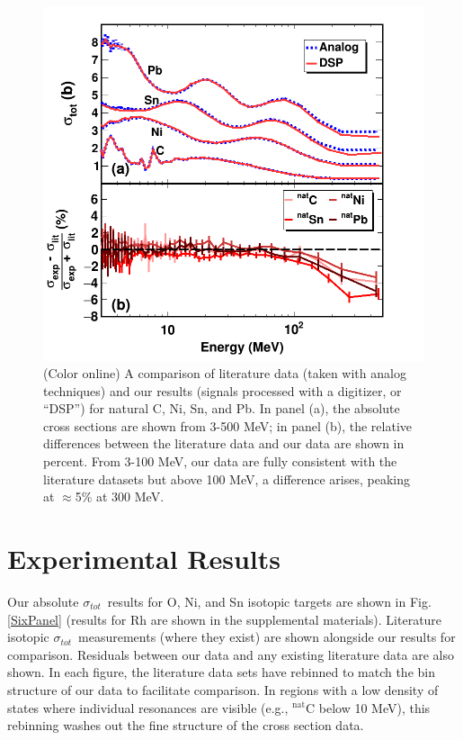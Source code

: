 \documentclass[twocolumn,secnumarabic,amssymb, nobibnotes, aps, prl,
superscriptaddress, nobalancelastpage, draft]{revtex4}
\newcommand{\tot}{\ensuremath{\sigma_{tot}}}
\begin{document}
\begin{figure}
    \includegraphics[width=\linewidth]{figures/literatureBenchmarking.png}
    \caption{(Color online) A comparison of literature data (taken with analog
    techniques) and our results (signals processed with a digitizer, or ``DSP'')
    for natural C, Ni, Sn, and Pb. In panel (a), the absolute cross sections are shown from
    3-500 MeV; in panel (b), the relative differences between the literature data and
    our data are shown in percent. From 3-100 MeV, our data are fully consistent with the
    literature datasets but above 100 MeV, a difference arises, peaking at
    $\approx$5\% at 300 MeV.}
    \label{LiteratureBenchmarking}
\end{figure}

\section{Experimental Results}
Our absolute \tot\ results for O, Ni, and Sn isotopic targets are shown in Fig.
\ref{SixPanel} (results for Rh are shown in the supplemental materials).
Literature isotopic \tot\ measurements
(where they exist) are shown alongside our results for comparison.
Residuals between our data and any existing literature data are also shown.
In each figure, the literature data sets have rebinned to match the bin
structure of our data to facilitate comparison. In regions with a low density of
states where individual resonances are visible (e.g., $^{\text{nat}}$C
below 10 MeV), this rebinning washes out the fine structure of the
cross section data.
\end{document}
